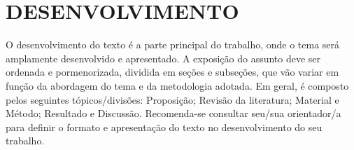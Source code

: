     \chapter{DESENVOLVIMENTO} %


O desenvolvimento do texto é a parte principal do trabalho, onde o tema será amplamente desenvolvido e apresentado. A exposição do assunto deve ser ordenada e pormenorizada, dividida em seções e subseções, que vão variar em função da abordagem do tema e da metodologia adotada. Em geral, é composto pelos seguintes tópicos/divisões: Proposição; Revisão da literatura; Material e Método; Resultado e Discussão. Recomenda-se consultar seu/sua orientador/a para definir o formato e apresentação do texto no desenvolvimento do seu trabalho.







